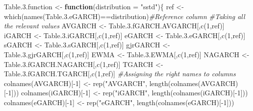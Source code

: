 \documentclass[a4paper, twoside]{templates/ociamthesis}
\newenvironment{Shaded}{\begin{snugshade}}{\end{snugshade}}
\newcommand{\AttributeTok}[1]{\textcolor[rgb]{0.77,0.63,0.00}{#1}}
\newcommand{\CommentTok}[1]{\textcolor[rgb]{0.56,0.35,0.01}{\textit{#1}}}
\newcommand{\ControlFlowTok}[1]{\textcolor[rgb]{0.13,0.29,0.53}{\textbf{#1}}}
\newcommand{\DecValTok}[1]{\textcolor[rgb]{0.00,0.00,0.81}{#1}}
\newcommand{\FloatTok}[1]{\textcolor[rgb]{0.00,0.00,0.81}{#1}}
\newcommand{\FunctionTok}[1]{\textcolor[rgb]{0.00,0.00,0.00}{#1}}
\newcommand{\NormalTok}[1]{#1}
\newcommand{\OtherTok}[1]{\textcolor[rgb]{0.56,0.35,0.01}{#1}}
\newcommand{\SpecialCharTok}[1]{\textcolor[rgb]{0.00,0.00,0.00}{#1}}
\newcommand{\StringTok}[1]{\textcolor[rgb]{0.31,0.60,0.02}{#1}}
\renewenvironment{Shaded}
{
  \vspace{10pt}%
  \begin{snugshade}%
}{%
  \end{snugshade}%
  \vspace{8pt}%
}
\begin{document}
\begin{Shaded}
\begin{Highlighting}[]
\NormalTok{Table.}\FloatTok{3.}\NormalTok{function }\OtherTok{\textless{}{-}} \ControlFlowTok{function}\NormalTok{(}\AttributeTok{distribution =} \StringTok{"sstd"}\NormalTok{)\{}
\NormalTok{ref }\OtherTok{\textless{}{-}} \FunctionTok{which}\NormalTok{(}\FunctionTok{names}\NormalTok{(Table.}\FloatTok{3.}\NormalTok{eGARCH)}\SpecialCharTok{==}\NormalTok{distribution)}\CommentTok{\#Reference column}
\CommentTok{\#Taking all the relevant values}
\NormalTok{AVGARCH }\OtherTok{\textless{}{-}}\NormalTok{ Table.}\FloatTok{3.}\NormalTok{fGARCH.AVGARCH[,}\FunctionTok{c}\NormalTok{(}\DecValTok{1}\NormalTok{,ref)]}
\NormalTok{iGARCH }\OtherTok{\textless{}{-}}\NormalTok{ Table.}\FloatTok{3.}\NormalTok{iGARCH[,}\FunctionTok{c}\NormalTok{(}\DecValTok{1}\NormalTok{,ref)]}
\NormalTok{eGARCH }\OtherTok{\textless{}{-}}\NormalTok{ Table.}\FloatTok{3.}\NormalTok{eGARCH[,}\FunctionTok{c}\NormalTok{(}\DecValTok{1}\NormalTok{,ref)]}
\NormalTok{sGARCH }\OtherTok{\textless{}{-}}\NormalTok{ Table.}\FloatTok{3.}\NormalTok{sGARCH[,}\FunctionTok{c}\NormalTok{(}\DecValTok{1}\NormalTok{,ref)]}
\NormalTok{gjrGARCH }\OtherTok{\textless{}{-}}\NormalTok{ Table.}\FloatTok{3.}\NormalTok{gjrGARCH[,}\FunctionTok{c}\NormalTok{(}\DecValTok{1}\NormalTok{,ref)]}
\NormalTok{EWMA }\OtherTok{\textless{}{-}}\NormalTok{ Table.}\FloatTok{3.}\NormalTok{EWMA[,}\FunctionTok{c}\NormalTok{(}\DecValTok{1}\NormalTok{,ref)]}
\NormalTok{NAGARCH }\OtherTok{\textless{}{-}}\NormalTok{ Table.}\FloatTok{3.}\NormalTok{fGARCH.NAGARCH[,}\FunctionTok{c}\NormalTok{(}\DecValTok{1}\NormalTok{,ref)]}
\NormalTok{TGARCH }\OtherTok{\textless{}{-}}\NormalTok{ Table.}\FloatTok{3.}\NormalTok{fGARCH.TGARCH[,}\FunctionTok{c}\NormalTok{(}\DecValTok{1}\NormalTok{,ref)]}
\CommentTok{\#Assigning the right names to columns}
\FunctionTok{colnames}\NormalTok{(AVGARCH)[}\SpecialCharTok{{-}}\DecValTok{1}\NormalTok{] }\OtherTok{\textless{}{-}} \FunctionTok{rep}\NormalTok{(}\StringTok{"AVGARCH"}\NormalTok{, }\FunctionTok{length}\NormalTok{(}\FunctionTok{colnames}\NormalTok{(AVGARCH)[}\SpecialCharTok{{-}}\DecValTok{1}\NormalTok{]))}
\FunctionTok{colnames}\NormalTok{(iGARCH)[}\SpecialCharTok{{-}}\DecValTok{1}\NormalTok{] }\OtherTok{\textless{}{-}} \FunctionTok{rep}\NormalTok{(}\StringTok{"iGARCH"}\NormalTok{, }\FunctionTok{length}\NormalTok{(}\FunctionTok{colnames}\NormalTok{(iGARCH)[}\SpecialCharTok{{-}}\DecValTok{1}\NormalTok{]))}
\FunctionTok{colnames}\NormalTok{(eGARCH)[}\SpecialCharTok{{-}}\DecValTok{1}\NormalTok{] }\OtherTok{\textless{}{-}} \FunctionTok{rep}\NormalTok{(}\StringTok{"eGARCH"}\NormalTok{, }\FunctionTok{length}\NormalTok{(}\FunctionTok{colnames}\NormalTok{(eGARCH)[}\SpecialCharTok{{-}}\DecValTok{1}\NormalTok{]))}

\end{Highlighting}
\end{Shaded}
\end{document}
